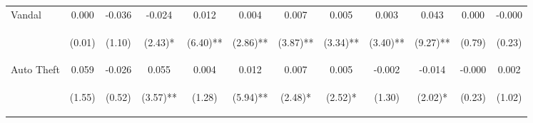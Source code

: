 \begin{tabular}{lccccccccccc}
\noalign{\smallskip}Vandal & 0.000 & -0.036 & -0.024 & 0.012 & 0.004 & 0.007 & 0.005 & 0.003 & 0.043 & 0.000 & -0.000\\
 & \begin{footnotesize}(0.01)\end{footnotesize} & \begin{footnotesize}(1.10)\end{footnotesize} & \begin{footnotesize}(2.43)*\end{footnotesize} & \begin{footnotesize}(6.40)**\end{footnotesize} & \begin{footnotesize}(2.86)**\end{footnotesize} & \begin{footnotesize}(3.87)**\end{footnotesize} & \begin{footnotesize}(3.34)**\end{footnotesize} & \begin{footnotesize}(3.40)**\end{footnotesize} & \begin{footnotesize}(9.27)**\end{footnotesize} & \begin{footnotesize}(0.79)\end{footnotesize} & \begin{footnotesize}(0.23)\end{footnotesize}\\
\noalign{\smallskip}Auto Theft & 0.059 & -0.026 & 0.055 & 0.004 & 0.012 & 0.007 & 0.005 & -0.002 & -0.014 & -0.000 & 0.002\\
 & \begin{footnotesize}(1.55)\end{footnotesize} & \begin{footnotesize}(0.52)\end{footnotesize} & \begin{footnotesize}(3.57)**\end{footnotesize} & \begin{footnotesize}(1.28)\end{footnotesize} & \begin{footnotesize}(5.94)**\end{footnotesize} & \begin{footnotesize}(2.48)*\end{footnotesize} & \begin{footnotesize}(2.52)*\end{footnotesize} & \begin{footnotesize}(1.30)\end{footnotesize} & \begin{footnotesize}(2.02)*\end{footnotesize} & \begin{footnotesize}(0.23)\end{footnotesize} & \begin{footnotesize}(1.02)\end{footnotesize}\\

\end{tabular}
